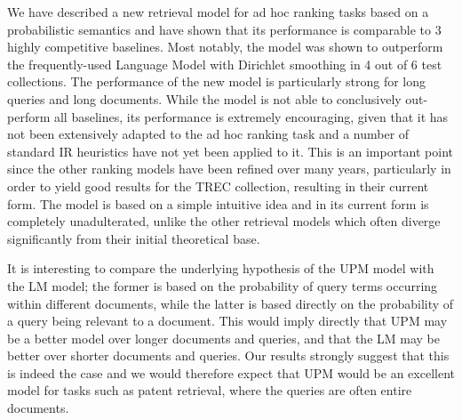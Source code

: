 We have described a new retrieval model for ad hoc ranking tasks based on a probabilistic semantics and have shown that its performance is comparable to 3 highly competitive baselines. Most notably, the model was shown to outperform the frequently-used Language Model with Dirichlet smoothing in 4 out of 6 test collections. The performance of the new model is particularly strong for long queries and long documents. While the model is not able to conclusively out-perform all baselines, its performance is extremely encouraging, given that it has not been extensively adapted to the ad hoc ranking task and a number of standard IR heuristics have not yet been applied to it. This is an important point since the other ranking models have been refined over many years, particularly in order to yield good results for the TREC collection, resulting in their current form. The model is based on a simple intuitive idea and in its current form is completely unadulterated, unlike the other retrieval models which often diverge significantly from their initial theoretical base. 

It is interesting to compare the underlying hypothesis of the UPM model with the LM model; the former is based on the probability of query terms occurring within different documents, while the latter is based directly on the probability of a query being relevant to a document. This would imply directly that UPM may be a better model over longer documents and queries, and that the LM may be better over shorter documents and queries. Our results strongly suggest that this is indeed the case and we would therefore expect that UPM would be an excellent model for tasks such as patent retrieval, where the queries are often entire documents.